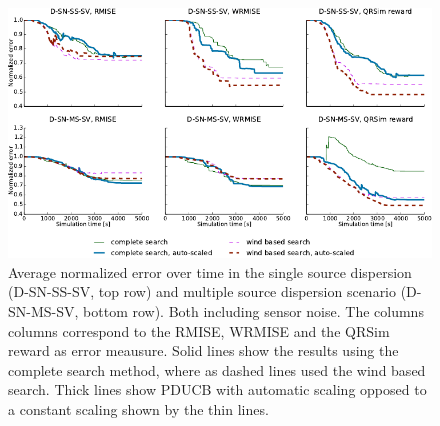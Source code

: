 \begin{figure}
    \centering
    \includegraphics{plots/noisy-sv}
    \caption[Normalized error in scenarios with sensor noise]{Average normalized 
        error over time in the single source dispersion (D-SN-SS-SV, top row) 
        and multiple source dispersion scenario (D-SN-MS-SV, bottom row). Both 
        including sensor noise.  The columns columns correspond to the RMISE, 
        WRMISE and the QRSim reward as error meausure. Solid lines show the 
        results using the complete search method, where as dashed lines used the 
        wind based search.  Thick lines show PDUCB with automatic scaling 
        opposed to a constant scaling shown by the thin 
        lines.}\label{fig:noisy-ss}
\end{figure}

\newenvironment{errtblb}{\begin{tabular}{llSSSS}\toprule}{\bottomrule\end{tabular}}
\newcommand*{\errtblheadb}[1]{
        & &
        \multicolumn{2}{c}{#1} &
        \multicolumn{2}{c}{Norm.\ #1} \\
        \cmidrule(lr){3-4} \cmidrule(lr){5-6}

        Search method &
        \multicolumn{1}{l}{Scaling} &
        \multicolumn{1}{c}{Mean} &
        \multicolumn{1}{c}{Std} &
        \multicolumn{1}{c}{Mean} &
        \multicolumn{1}{c}{Std} \\
        & &
        \multicolumn{1}{c}{\si{\nano\gram\per\meter\cubed}} &
        \multicolumn{1}{c}{\si{\nano\gram\per\meter\cubed}} &
        & \\ \midrule }

